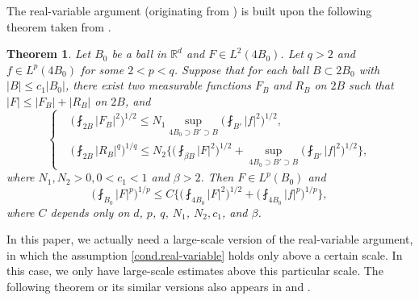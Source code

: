 \documentclass[reqno,12pt]{amsart} %
\newtheorem{theorem}{Theorem}[section]
\theoremstyle{definition}
\theoremstyle{remark}
\numberwithin{equation}{section}
\newcommand{\R}{\mathbb{R}}
\begin{document}
The real-variable argument (originating from \cite{CP98}) is built upon the following theorem taken from \cite[Theorem 4.2.3]{ShenBook}.
\begin{theorem}\label{thm.full real-variable}
Let $B_0$ be a ball in $\R^d$ and $F \in L^2(4B_0)$. Let $q>2$ and $f \in L^p(4B_0)$ for some $2 < p < q$. Suppose that for each ball $B \subset 2B_0$ with $|B| \le c_1 |B_0|$, there exist two measurable functions $F_B$ and $R_B$ on $2B$ such that $|F| \le |F_B| + |R_B|$ on $2B$, and
\begin{equation}\label{cond.real-variable}
\left\{
\begin{aligned}
& \bigg( \fint_{2B} |F_B|^2 \bigg)^{1/2} 
\leq N_1 \sup_{4B_0 \supset B' \supset B} \bigg( \fint_{B'} |f|^2  \bigg)^{1/2},\\
& \bigg( \fint_{2B} |R_B|^q \bigg)^{1/q} 
\leq N_2 \bigg\{ 
\bigg( \fint_{\beta B} |F|^2  \bigg)^{1/2} 
+ \sup_{4B_0 \supset B' \supset B} \bigg(  \fint_{B'} |f|^2 \bigg)^{1/2} 
\bigg\},
\end{aligned}
\right.
\end{equation}
where $N_1, N_2 > 0, 0<c_1<1$ and $\beta > 2$. Then $F \in L^p(B_0)$ and
\begin{equation}
    \bigg( \fint_{B_0} |F|^p \bigg)^{1/p} \le C \bigg\{ \bigg( \fint_{4B_0} |F|^2 \bigg)^{1/2} + \bigg( \fint_{4B_0} |f|^p \bigg)^{1/p} \bigg\},
\end{equation}
where $C$ depends only on $d$, $p$, $q$, $N_1$, $N_2, c_1$, and $\beta$.
\end{theorem}

In this paper, we actually need a large-scale version of the real-variable argument, in which the assumption \eqref{cond.real-variable} holds only above a certain scale. In this case, we only have large-scale estimates above this particular scale. The following theorem or its similar versions also appears in \cite[Remark 4.2]{S23} and \cite[Theorem 2.6]{Z21}.
\end{document}
